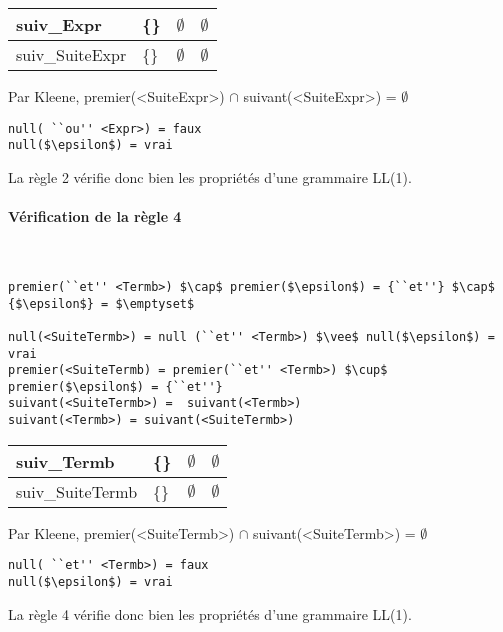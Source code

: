 \documentclass[a4paper]{article}
\begin{document}
\begin{center}
    \begin{tabular}{ | l | l | l | l |}
      \hline
      suiv\_Expr & \{\} & $\emptyset$ & $\emptyset$ \\ \hline
      suiv\_SuiteExpr & \{\} & $\emptyset$ & $\emptyset$ \\
      \hline
    \end{tabular}
\end{center}

Par Kleene, premier(<SuiteExpr>) $\cap$ suivant(<SuiteExpr>) = $\emptyset$

\begin{lstlisting}
null( ``ou'' <Expr>) = faux
null($\epsilon$) = vrai
\end{lstlisting}

La règle 2 vérifie donc bien les propriétés d'une grammaire LL(1).

\paragraph{Vérification de la règle 4}
~
\begin{lstlisting}
premier(``et'' <Termb>) $\cap$ premier($\epsilon$) = {``et''} $\cap$ {$\epsilon$} = $\emptyset$

null(<SuiteTermb>) = null (``et'' <Termb>) $\vee$ null($\epsilon$) = vrai
premier(<SuiteTermb) = premier(``et'' <Termb>) $\cup$ premier($\epsilon$) = {``et''}
suivant(<SuiteTermb>) =  suivant(<Termb>)
suivant(<Termb>) = suivant(<SuiteTermb>)
\end{lstlisting}

\begin{center}
    \begin{tabular}{ | l | l | l | l |}
      \hline
      suiv\_Termb & \{\} & $\emptyset$ & $\emptyset$ \\ \hline
      suiv\_SuiteTermb & \{\} & $\emptyset$ & $\emptyset$ \\
      \hline
    \end{tabular}
\end{center}

Par Kleene, premier(<SuiteTermb>) $\cap$ suivant(<SuiteTermb>) = $\emptyset$

\begin{lstlisting}
null( ``et'' <Termb>) = faux
null($\epsilon$) = vrai
\end{lstlisting}

La règle 4 vérifie donc bien les propriétés d'une grammaire LL(1).
\end{document}
